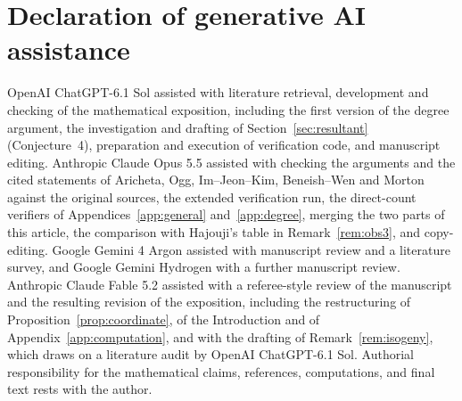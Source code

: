 \documentclass[11pt,a4paper]{article}
\theoremstyle{remark}\newtheorem{remark}[theorem]{Remark}
\numberwithin{equation}{section}
\begin{document}
	\section*{Declaration of generative AI assistance}
	OpenAI ChatGPT-6.1 Sol assisted with literature retrieval, development and checking of the mathematical exposition, including the first version of the degree argument, the investigation and drafting of Section~\ref{sec:resultant} (Conjecture~4), preparation and execution of verification code, and manuscript editing. Anthropic Claude Opus 5.5 assisted with checking the arguments and the cited statements of Aricheta, Ogg, Im--Jeon--Kim, Beneish--Wen and Morton against the original sources, the extended verification run, the direct-count verifiers of Appendices~\ref{app:general} and~\ref{app:degree}, merging the two parts of this article, the comparison with Hajouji's table in Remark~\ref{rem:obs3}, and copy-editing. Google Gemini 4 Argon assisted with manuscript review and a literature survey, and Google Gemini Hydrogen with a further manuscript review. Anthropic Claude Fable 5.2 assisted with a referee-style review of the manuscript and the resulting revision of the exposition, including the restructuring of Proposition~\ref{prop:coordinate}, of the Introduction and of Appendix~\ref{app:computation}, and with the drafting of Remark~\ref{rem:isogeny}, which draws on a literature audit by OpenAI ChatGPT-6.1 Sol. Authorial responsibility for the mathematical claims, references, computations, and final text rests with the author.
	
\end{document}
